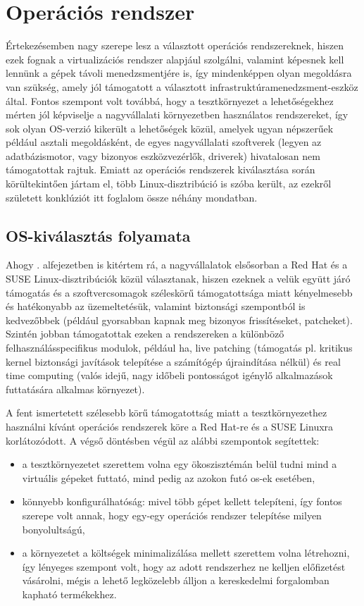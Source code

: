 \section{Operációs rendszer}
Értekezésemben nagy szerepe lesz a választott operációs rendszereknek, hiszen ezek fognak a virtualizációs rendszer alapjául szolgálni, valamint képesnek kell lennünk a gépek távoli menedzsmentjére is, így mindenképpen olyan megoldásra van szükség, amely jól támogatott a választott infrastruktúramenedzsment-eszköz által. Fontos szempont volt továbbá, hogy a tesztkörnyezet a lehetőségekhez mérten jól képviselje a nagyvállalati környezetben használatos rendszereket, így sok olyan OS-verzió kikerült a lehetőségek közül, amelyek ugyan népszerűek például asztali megoldásként, de egyes nagyvállalati szoftverek (legyen az adatbázismotor, vagy bizonyos eszközvezérlők, driverek) hivatalosan nem támogatottak rajtuk. Emiatt az operációs rendszerek kiválasztása során körültekintően jártam el, több Linux-disztribúció is szóba került, az ezekről született konklúziót itt foglalom össze néhány mondatban.

\subsection{OS-kiválasztás folyamata}
Ahogy . alfejezetben is kitértem rá, a nagyvállalatok elsősorban a Red Hat és a SUSE Linux-disztribúciók közül választanak, hiszen ezeknek a velük együtt járó támogatás és a szoftvercsomagok széleskörű támogatottsága miatt kényelmesebb és hatékonyabb az üzemeltetésük, valamint biztonsági szempontból is kedvezőbbek (például gyorsabban kapnak meg bizonyos frissítéseket, patcheket). Szintén jobban támogatottak ezeken a rendszereken a különböző felhasználásspecifikus modulok, például \acrfull{ha}, live patching (támogatás pl. kritikus kernel biztonsági javítások telepítése a számítógép újraindítása nélkül) és real time computing (valós idejű, nagy időbeli pontosságot igénylő alkalmazások futtatására alkalmas környezet).

A fent ismertetett szélesebb körű támogatottság miatt a tesztkörnyezethez használni kívánt operációs rendszerek köre a Red Hat-re és a SUSE Linuxra korlátozódott. A végső döntésben végül az alábbi szempontok segítettek:
\begin{itemize}
	\item a tesztkörnyezetet szerettem volna egy ökoszisztémán belül tudni mind a virtuális gépeket futtató, mind pedig az azokon futó \acrshort{os}-ek esetében,
	\item könnyebb konfigurálhatóság: mivel több gépet kellett telepíteni, így fontos szerepe volt annak, hogy egy-egy operációs rendszer telepítése milyen bonyolultságú,
	\item a környezetet a költségek minimalizálása mellett szerettem volna létrehozni, így lényeges szempont volt, hogy az adott rendszerhez ne kelljen előfizetést vásárolni, mégis a lehető legközelebb álljon a kereskedelmi forgalomban kapható termékekhez.
\end{itemize}

